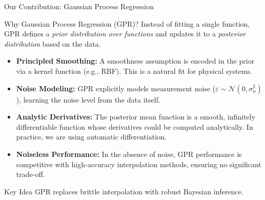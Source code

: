 \documentclass[aspectratio=169]{beamer}
\begin{document}
\begin{frame}[shrink]{Our Contribution: Gaussian Process Regression}
    \begin{block}{Why Gaussian Process Regression (GPR)?}
    \small
    Instead of fitting a single function, GPR defines a \textit{prior distribution over functions} and updates it to a \textit{posterior distribution} based on the data.
    \begin{itemize}
        \item \textbf{Principled Smoothing:} A smoothness assumption is encoded in the prior via a kernel function (e.g., RBF). This is a natural fit for physical systems.
        \item \textbf{Noise Modeling:} GPR explicitly models measurement noise ($\varepsilon \sim \mathcal{N}(0, \sigma_n^2)$), learning the noise level from the data itself.
        \item \textbf{Analytic Derivatives:} The posterior mean function is a smooth, infinitely differentiable function whose derivatives could be computed analytically.  In practice, we are using automatic differentiation.
        \item \textbf{Noiseless Performance:} In the absence of noise, GPR performance is competitive with high-accuracy interpolation methods, ensuring no significant trade-off.
    \end{itemize}
    \end{block}
    \vspace{1em}
    \begin{alertblock}{Key Idea}
        \centering
        \normalsize
        GPR replaces brittle interpolation with robust Bayesian inference.
    \end{alertblock}
\end{frame}
\end{document}
